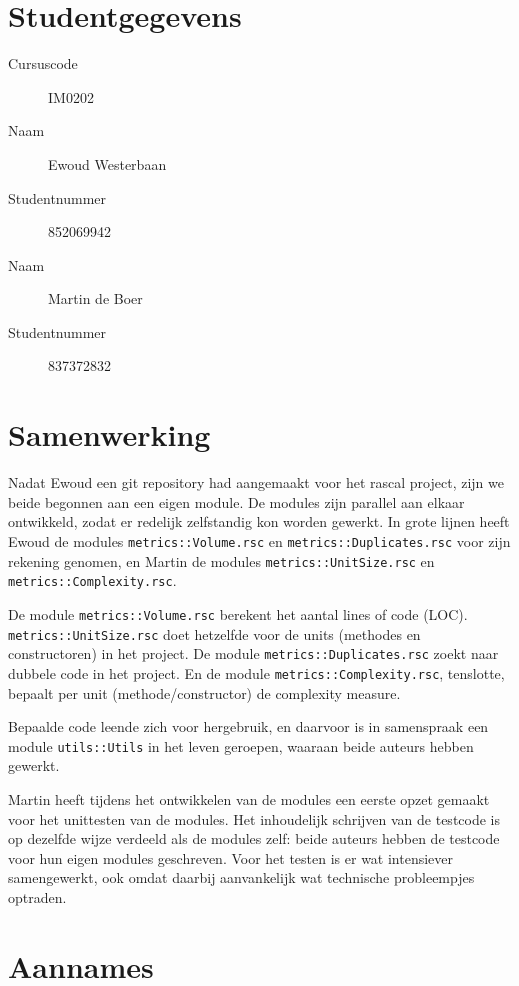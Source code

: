\documentclass[a4paper]{article}
\begin{document}
\pagestyle{fancy}

\section*{Studentgegevens}
\begin{description}
	\item [Cursuscode] IM0202
	\item [Naam] Ewoud Westerbaan
	\item [Studentnummer] 852069942
	\item [Naam] Martin de Boer
	\item [Studentnummer] 837372832
\end{description}

\section*{Samenwerking}
Nadat Ewoud een git repository had aangemaakt voor het rascal
project, zijn we beide begonnen aan een eigen module. De modules
zijn parallel aan elkaar ontwikkeld, zodat er redelijk
zelfstandig kon worden gewerkt. In grote lijnen heeft Ewoud de
modules \texttt{metrics::Volume.rsc} en
\texttt{metrics::Duplicates.rsc} voor zijn rekening genomen, en
Martin de modules \texttt{metrics::UnitSize.rsc} en
\texttt{metrics::Complexity.rsc}.

De module \texttt{metrics::Volume.rsc} berekent het aantal lines
of code (LOC). \texttt{metrics::UnitSize.rsc} doet hetzelfde
voor de units (methodes en constructoren) in het project. De
module \texttt{metrics::Duplicates.rsc} zoekt naar dubbele code
in het project. En de module \texttt{metrics::Complexity.rsc},
tenslotte, bepaalt per unit (methode/constructor) de complexity
measure.

Bepaalde code leende zich voor hergebruik, en daarvoor is in
samenspraak een module \texttt{utils::Utils} in het leven
geroepen, waaraan beide auteurs hebben gewerkt.

Martin heeft tijdens het ontwikkelen van de modules een eerste
opzet gemaakt voor het unittesten van de modules. Het
inhoudelijk schrijven van de testcode is op dezelfde wijze
verdeeld als de modules zelf: beide auteurs hebben de testcode
voor hun eigen modules geschreven. Voor het testen is er wat
intensiever samengewerkt, ook omdat daarbij aanvankelijk wat
technische probleempjes optraden.

\section{Aannames}
\end{document}
